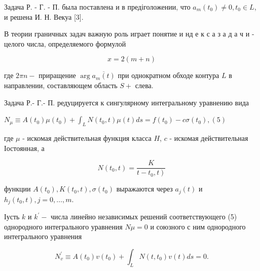 \documentclass[10pt]{article}
\begin{document}
Задача Р. - Г. - П. была поставлена и в предіголожении, что $a_{m}\left(t_{0}\right) \neq 0, t_{0} \in L$, и решена И. Н. Векуа [3].



В теории граничных задач важную роль играет понятие и нд е к с а з а д а ч и - целого числа, определяемого формулой



\[

x=2(m+n)

\]



где $2 \pi n-$ приращение $\arg \overline{a_{m}(t)}$ при однократном обходе контура $L$ в направлении, составляющем область $S+$ слева.



Задача Р.- Г.- П. редуцируется к сингулярному интегральному уравнению вида



$N_{\mu} \equiv A\left(t_{0}\right) \mu\left(t_{0}\right)+\int_{L} N\left(t_{0}, t\right) \mu(t) d s=f\left(t_{0}\right)-c \sigma\left(t_{0}\right),(5)$



где $\mu$ - искомая действительная функция класса $H$, $c$ - искомая действительная Іостоянная, а



\[

N\left(t_{0}, t\right)=\frac{K}{\left.t-t_{0}, t\right)}

\]



функции $A\left(t_{0}\right), K\left(t_{0}, t\right), \sigma\left(t_{0}\right)$ выражаются через $a_{j}(t)$ и $h_{j}\left(t_{0}, t\right), j=0, \ldots, m$.



Іусть $k$ и $k^{\prime}-$ числа линейно независимых решений соответствующего (5) однородного интегрального уравнения $N \mu=0$ и союзного с ним однородного интегрального уравнения



\[

N_{v}^{\prime} \equiv A\left(t_{0}\right) v\left(t_{0}\right)+\int_{L} N\left(t, t_{0}\right) v(t) d s=0 .

\]
\end{document}
